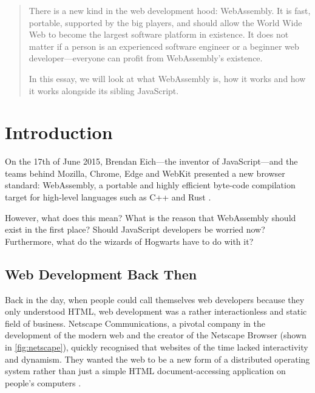 \documentclass[10pt]{article}
\begin{document}
\begin{sloppypar}
  \begin{abstract}
    There is a new kind in the web development hood: WebAssembly. It is fast, portable, supported by the big players, and should allow the World Wide Web to become the largest software platform in existence. It does not matter if a person is an experienced software engineer or a beginner web developer—everyone can profit from WebAssembly’s existence.

    In this essay, we will look at what WebAssembly is, how it works and how it works alongside its sibling JavaScript.
  \end{abstract}

  \pagebreak
  \tableofcontents
  \pagebreak
  \listoffigures
  \pagebreak
  \listoftables
  \pagebreak
  \lstlistoflistings
  \pagebreak


  \section{Introduction}
  \label{sec:introduction}

  On the 17th of June 2015, Brendan Eich—the inventor of JavaScript—and the teams behind Mozilla, Chrome, Edge and WebKit presented a new browser standard: \mbox{WebAssembly}, a portable and highly efficient byte-code compilation target for high-level languages such as C++ and Rust \citep{eich_asmjs_2015}.

  However, what does this mean? What is the reason that WebAssembly should exist in the first place? Should JavaScript developers be worried now? Furthermore, what do the wizards of Hogwarts have to do with it?

  \subsection{Web Development Back Then}
  \label{sec:back-then}

  Back in the day, when people could call themselves web developers because they only understood HTML, web development was a rather interactionless and static field of business. Netscape Communications, a pivotal company in the development of the modern web and the creator of the Netscape Browser (shown in \autoref{fig:netscape}), quickly recognised that websites of the time lacked interactivity and dynamism. They wanted the web to be a new form of a distributed operating system rather than just a simple HTML document-accessing application on people’s computers \citep{cassel_brendan_2018}.


\end{sloppypar}
\end{document}

